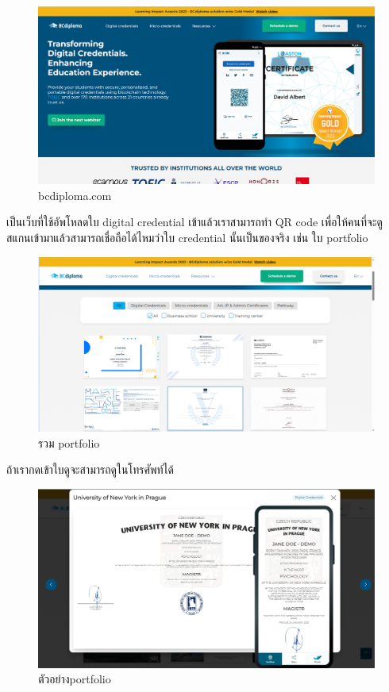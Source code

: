 \graphicspath{ {./images/} }
\begin{figure}[htbp]
  \centering 
  \includegraphics[scale=0.3]{bcdiploma.png}
  \caption[bcdiploma.com]{bcdiploma.com}
  \label{bcdiploma}
\end{figure}

เป็นเว็บที่ใช้อัพโหลดใบ digital credential เข้าแล้วเราสามารถทำ QR code เพื่อให้คนที่จะดูสแกนเข้ามาแล้วสามารถเชื่อถือได้ไหมว่าใบ credential นั้นเป็นของจริง เช่น ใบ portfolio

\graphicspath{ {./images/} }
\begin{figure}[htbp]
  \centering 
  \includegraphics[scale=0.3]{bcdiploma_1.png}
  \caption[portfolio]{รวม portfolio}
  \label{bcdiploma_1}
\end{figure}

ถ้าเรากดเข้าใบดูจะสามารถดูในโทรศัพท์ได้

\graphicspath{ {./images/} }
\begin{figure}[htbp]
  \centering 
  \includegraphics[scale=0.3]{bcdiploma_2.png}
  \caption[ตัวอย่าง portfolio]{ตัวอย่างportfolio}
  \label{bcdiploma_2}
\end{figure}

